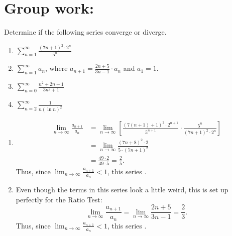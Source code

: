 \documentclass[]{ximera}
\begin{document}
\section{Group work:}



\begin{problem}
Determine if the following series converge or diverge.
	\begin{enumerate}
	
	\item  $\sum_{n=1}^\infty \frac{(7n+1)^2 \cdot 2^n}{5^n}$
	
	\item  $\sum_{n=1}^\infty a_n$, where $a_{n+1} = \frac{2n+5}{3n-1} \cdot a_n$ and $a_1 = 1$.
	
	\item  $\sum_{n=0}^\infty \frac{n^2 + 2n + 1}{3n^2 +1}$
	
	\item  $\sum_{n=2}^\infty \frac{1}{n(\ln n)^2}$
	
	\end{enumerate}
	
	\begin{freeResponse}
		\begin{enumerate}
	
		\item  {}
			\begin{align*}
			\lim_{n \to \infty} \frac{a_{n+1}}{a_n} 
			&= \lim_{n \to \infty} \left[ \frac{(7(n+1) + 1)^2 \cdot 2^{n+1}}{5^{n+1}} \cdot \frac{5^n}{(7n+1)^2 \cdot 2^n} \right]  \\
			&= \lim_{n \to \infty} \frac{(7n+8)^2 \cdot 2}{5 \cdot (7n+1)^2}  \\
			&= \frac{49 \cdot 2}{49 \cdot 5} = \frac{2}{5}.
			\end{align*}
		Thus, since $\lim_{n \to \infty} \frac{a_{n+1}}{a_n} < 1$, this series .  
		
		
	
		\item  {}
		
		Even though the terms in this series look a little weird, this is set up perfectly for the Ratio Test:
			\[
			\lim_{n \to \infty} \frac{a_{n+1}}{a_n} = \lim_{n \to \infty} \frac{2n+5}{3n-1} = \frac{2}{3}.
			\]
		Thus, since $\lim_{n \to \infty} \frac{a_{n+1}}{a_n} < 1$, this series .  
		
		
	

\end{enumerate}
\end{freeResponse}
\end{problem}
\end{document}
